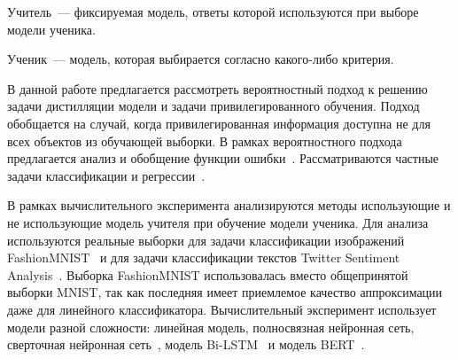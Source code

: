 \begin{definition}
Учитель~--- фиксируемая модель, ответы которой используются при выборе модели ученика.
\end{definition}

\begin{definition}
Ученик~--- модель, которая выбирается согласно какого-либо критерия.
\end{definition}

В данной работе предлагается рассмотреть вероятностный подход к решению задачи дистилляции модели и задачи привилегированного обучения. Подход обобщается на случай, когда привилегированная информация доступна не для всех объектов из обучающей выборки. В рамках вероятностного подхода предлагается анализ и обобщение функции ошибки~\cite{Hinton2015, Lopez2016}. Рассматриваются частные задачи классификации и регрессии~\cite{Ivakhnenko1994}.


В рамках вычислительного эксперимента анализируются методы использующие и не использующие модель учителя при обучение модели ученика. Для анализа используются реальные выборки для задачи классификации изображений FashionMNIST~\cite{fashionmnist} и для задачи классификации текстов Twitter Sentiment Analysis~\cite{twiter2013}. Выборка FashionMNIST использовалась вместо общепринятой выборки MNIST, так как последняя имеет приемлемое качество аппроксимации даже для линейного классификатора. Вычислительный эксперимент использует модели разной сложности: линейная модель, полносвязная нейронная сеть, сверточная нейронная сеть~\cite{LeCun1989}, модель Bi-LSTM~\cite{Schmidhuber1997} и модель BERT~\cite{Devlin2018}.

